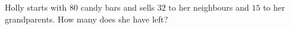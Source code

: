 Holly starts with $80$ candy bars and sells $32$ to her neighbours and $15$ to her grandparents. How many does she have left?
